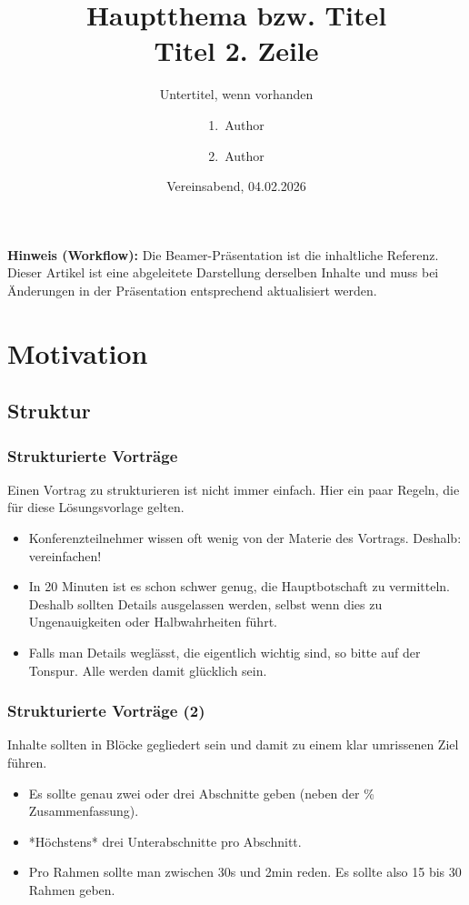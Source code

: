 \documentclass[12pt,ngerman]{scrartcl}
\title{Hauptthema bzw. Titel\\Titel 2. Zeile}
\subtitle{Untertitel, wenn vorhanden}
\author{1.~Author \and 2.~Author}
\date{Vereinsabend, 04.02.2026}
\begin{document}
\AVVPMakeTitlePage
\clearpage
\bigskip

\noindent\textbf{Hinweis (Workflow):} Die Beamer-Präsentation ist die inhaltliche Referenz. Dieser Artikel ist eine abgeleitete Darstellung derselben Inhalte und muss bei Änderungen in der Präsentation entsprechend aktualisiert werden.

\tableofcontents

\section{Motivation}

\subsection{Struktur}

\subsubsection*{Strukturierte Vorträge}

Einen Vortrag zu strukturieren ist nicht immer einfach. Hier ein paar Regeln, die für diese Lösungsvorlage gelten.

\begin{itemize}
\item Konferenzteilnehmer wissen oft wenig von der Materie des Vortrags. Deshalb: vereinfachen!
\item In 20 Minuten ist es schon schwer genug, die Hauptbotschaft zu vermitteln. Deshalb sollten Details ausgelassen werden, selbst wenn dies zu Ungenauigkeiten oder Halbwahrheiten führt.
\item Falls man Details weglässt, die eigentlich wichtig sind, so bitte auf der Tonspur. Alle werden damit glücklich sein.
\end{itemize}

\subsubsection*{Strukturierte Vorträge (2)}

Inhalte sollten in Blöcke gegliedert sein und damit zu einem klar umrissenen Ziel führen.

\begin{itemize}
\item Es sollte genau zwei oder drei Abschnitte geben (neben der \% Zusammenfassung).
\item {*}Höchstens{*} drei Unterabschnitte pro Abschnitt.
\item Pro Rahmen sollte man zwischen 30s und 2min reden. Es sollte also 15 bis 30 Rahmen geben.
\end{itemize}
\end{document}
